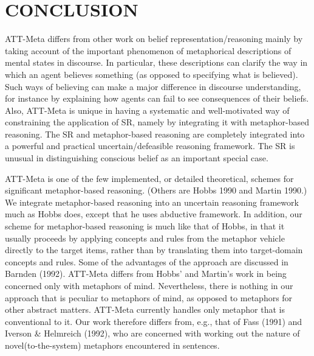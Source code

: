 \section{CONCLUSION} %

ATT-Meta differs from other work on belief representation/reasoning mainly by
taking account of the important phenomenon of metaphorical descriptions of
mental states in discourse. In particular, these descriptions can clarify the
way in which an agent believes something (as opposed to specifying what is
believed). Such ways of believing can make a major difference in discourse
understanding, for instance by explaining how agents can fail to see
consequences of their beliefs.  Also, ATT-Meta is unique in having a systematic
and well-motivated way of constraining the application of SR, namely by
integrating it with metaphor-based reasoning.  The SR and metaphor-based
reasoning are completely integrated into a powerful and practical
uncertain/defeasible reasoning framework. The SR is unusual in distinguishing
conscious belief as an important special case.

ATT-Meta is one of the few implemented, or detailed theoretical, schemes for
significant metaphor-based reasoning. (Others are Hobbs 1990 and Martin 1990.)
We integrate metaphor-based reasoning into an uncertain reasoning framework
much as Hobbs does, except that he uses abductive framework.  In addition, our
scheme for metaphor-based reasoning is much like that of Hobbs, in that it
usually proceeds by applying concepts and rules from the metaphor vehicle
directly to the target items, rather than by translating them into
target-domain concepts and rules. Some of the advantages of the approach are
discussed in Barnden (1992).  ATT-Meta differs from Hobbs' and Martin's work in
being concerned only with metaphors of mind.  Nevertheless, there is nothing in
our approach that is peculiar to metaphors of mind, as opposed to metaphors for
other abstract matters.  ATT-Meta currently handles only metaphor that is
conventional to it. Our work therefore differs from, e.g., that of Fass (1991)
and Iverson \& Helmreich (1992), who are concerned with working out the nature of
novel(to-the-system) metaphors encountered in sentences. 

